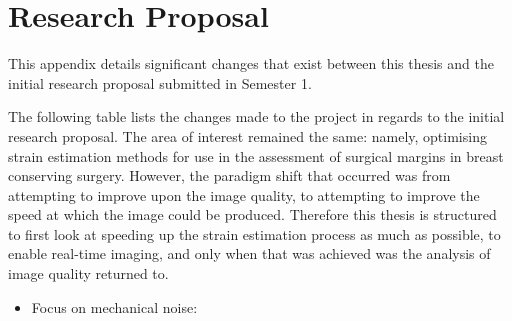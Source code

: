 \chapter{Research Proposal}

This appendix details significant changes that exist between this thesis and the initial research proposal submitted in Semester 1.

The following table lists the changes made to the project in regards to the initial research proposal. The area of interest remained the same: namely, optimising strain estimation methods for use in the assessment of surgical margins in breast conserving surgery. However, the paradigm shift that occurred was from attempting to improve upon the image quality, to attempting to improve the speed at which the image could be produced. Therefore this thesis is structured to first look at speeding up the strain estimation process as much as possible, to enable real-time imaging, and only when that was achieved was the analysis of image quality returned to. 
\begin{itemize}
\item Focus on mechanical noise: 
\end{itemize}



